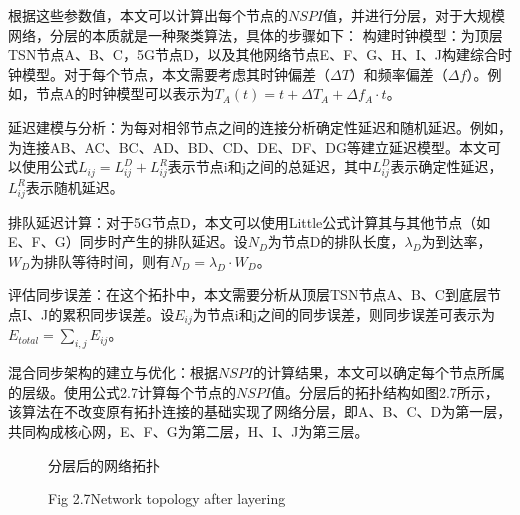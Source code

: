 \documentclass[UTF8,a4paper,12pt]{ctexart}
\numberwithin{equation}{section}
\begin{document}
	根据这些参数值，本文可以计算出每个节点的$NSPI$值，并进行分层，对于大规模网络，分层的本质就是一种聚类算法，具体的步骤如下：
	构建时钟模型：为顶层TSN节点A、B、C，5G节点D，以及其他网络节点E、F、G、H、I、J构建综合时钟模型。对于每个节点，本文需要考虑其时钟偏差（$\Delta T$）和频率偏差（$\Delta f$）。例如，节点A的时钟模型可以表示为$T_A(t) = t + \Delta T_A + \Delta f_A \cdot t$。
	
	延迟建模与分析：为每对相邻节点之间的连接分析确定性延迟和随机延迟。例如，为连接AB、AC、BC、AD、BD、CD、DE、DF、DG等建立延迟模型。本文可以使用公式$L_{ij} = L_{ij}^D + L_{ij}^R$表示节点i和j之间的总延迟，其中$L_{ij}^D$表示确定性延迟，$L_{ij}^R$表示随机延迟。
	
	排队延迟计算：对于5G节点D，本文可以使用Little公式计算其与其他节点（如E、F、G）同步时产生的排队延迟。设$N_D$为节点D的排队长度，$\lambda_D$为到达率，$W_D$为排队等待时间，则有$N_D = \lambda_D \cdot W_D$。
	
	评估同步误差：在这个拓扑中，本文需要分析从顶层TSN节点A、B、C到底层节点I、J的累积同步误差。设$E_{ij}$为节点i和j之间的同步误差，则同步误差可表示为$E_{total} = \sum_{i,j} E_{ij}$。
	
	混合同步架构的建立与优化：根据$NSPI$的计算结果，本文可以确定每个节点所属的层级。使用公式2.7计算每个节点的$NSPI$值。分层后的拓扑结构如图2.7所示，该算法在不改变原有拓扑连接的基础实现了网络分层，即A、B、C、D为第一层，共同构成核心网，E、F、G为第二层，H、I、J为第三层。
	\begin{figure}[H]
		\caption{分层后的网络拓扑}
		\vspace{-10pt}
		\caption*{Fig 2.7\quad Network topology after layering}
	\end{figure}
	
\end{document}
